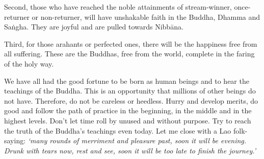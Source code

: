 Second, those who have reached the noble attainments of stream-winner, once-returner or non-returner, will have unshakable faith in the Buddha, Dhamma and Sa\.ngha. They are joyful and are pulled towards Nibb\=ana.

Third, for those arahants or perfected ones, there will be the happiness free from all suffering. These are the Buddhas, free from the world, complete in the faring of the holy way.

We have all had the good fortune to be born as human beings and to hear the teachings of the Buddha. This is an opportunity that millions of other beings do not have. Therefore, do not be careless or heedless. Hurry and develop merits, do good and follow the path of practice in the beginning, in the middle and in the highest levels. Don't let time roll by unused and without purpose. Try to reach the truth of the Buddha's teachings even today. Let me close with a Lao folk-saying: \textit{`many rounds of merriment and pleasure past, soon it will be evening. Drunk with tears now, rest and see, soon it will be too late to finish the journey.'}
